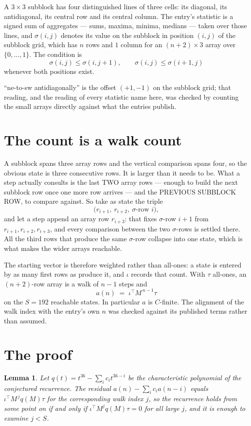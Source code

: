 \documentclass[11pt,a4paper]{article}
\theoremstyle{plain}
\newtheorem{lemma}[theorem]{Lemma}
\theoremstyle{definition}
\begin{document}
A $3\times3$ subblock has four distinguished lines of three cells: its diagonal, its
antidiagonal, its central row and its central column. The entry's statistic is a signed sum of
aggregates --- sums, maxima, minima, medians --- taken over those lines, and $\sigma(i,j)$
denotes its value on the subblock in position $(i,j)$ of the subblock grid, which has $n$ rows
and $1$ column for an $(n+2)\times3$ array over $\{0,\dots,1\}$. The condition is
\[
\sigma(i,j)\le\sigma(i,j+1),\qquad \sigma(i,j)\le\sigma(i+1,j)
\]
whenever both positions exist.

``ne-to-sw antidiagonally'' is the offset $(+1,-1)$ on the subblock grid; that reading, and
the reading of every statistic name here, was checked by counting the small arrays directly
against what the entries publish.

\section{The count is a walk count}

A subblock spans three array rows and the vertical comparison spans four, so the obvious state
is three consecutive rows. It is larger than it needs to be. What a step actually consults is
the last TWO array rows --- enough to build the next subblock row once one more row arrives ---
and the PREVIOUS SUBBLOCK ROW, to compare against. So take as state the triple
\[
\bigl(r_{i+1},\ r_{i+2},\ \sigma\text{-row }i\bigr),
\]
and let a step append an array row $r_{i+3}$: that fixes $\sigma$-row $i+1$ from
$r_{i+1},r_{i+2},r_{i+3}$, and every comparison between the two $\sigma$-rows is settled
there. All the third rows that produce the same $\sigma$-row collapse into one state, which is
what makes the wider arrays reachable.

The starting vector is therefore weighted rather than all-ones: a state is entered by as many
first rows as produce it, and $\iota$ records that count. With $\tau$ all-ones, an
$(n+2)$-row array is a walk of $n-1$ steps and
\[
a(n)\;=\;\iota^{\!\top}M^{\,n-1}\tau
\]
on the $S=192$ reachable states. In particular $a$ is $C$-finite. The alignment of the walk
index with the entry's own $n$ was checked against its published terms rather than assumed.

\section{The proof}

\begin{lemma}\label{lem:crit}
Let $q(t)=t^{36}-\sum_i c_it^{36-i}$ be the characteristic polynomial of the
conjectured recurrence. The residual $a(n)-\sum_ic_ia(n-i)$ equals
$\iota^{\!\top}M^{\,j}q(M)\tau$ for the corresponding walk index $j$, so the recurrence
holds from some point on if and only if $\iota^{\!\top}M^{j}q(M)\tau=0$ for all large $j$,
and it is enough to examine $j<S$.
\end{lemma}
\end{document}
